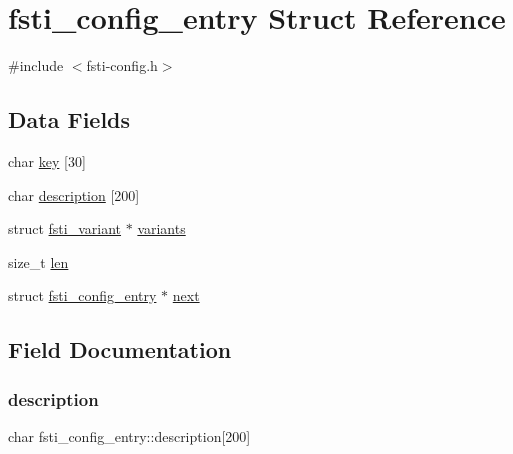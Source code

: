 \hypertarget{structfsti__config__entry}{}\section{fsti\+\_\+config\+\_\+entry Struct Reference}
\label{structfsti__config__entry}


{\ttfamily \#include $<$fsti-\/config.\+h$>$}

\subsection*{Data Fields}
\begin{DoxyCompactItemize}
\item 
char \mbox{\hyperlink{structfsti__config__entry_ac9d616365f25f18d04fa9cd4d141860a}{key}} \mbox{[}30\mbox{]}
\item 
char \mbox{\hyperlink{structfsti__config__entry_a04240c49953dafa8879450149c3954d1}{description}} \mbox{[}200\mbox{]}
\item 
struct \mbox{\hyperlink{structfsti__variant}{fsti\+\_\+variant}} $\ast$ \mbox{\hyperlink{structfsti__config__entry_a0cde1f42c2d28c442930678728cae461}{variants}}
\item 
size\+\_\+t \mbox{\hyperlink{structfsti__config__entry_ab780e8c7002b1b0dccfbcafe0b7f1216}{len}}
\item 
struct \mbox{\hyperlink{structfsti__config__entry}{fsti\+\_\+config\+\_\+entry}} $\ast$ \mbox{\hyperlink{structfsti__config__entry_a3900e815b95ddedbfe86b63639804835}{next}}
\end{DoxyCompactItemize}


\subsection{Field Documentation}
\mbox{\label{structfsti__config__entry_a04240c49953dafa8879450149c3954d1}} 
\subsubsection{\texorpdfstring{description}{description}}
{\footnotesize\ttfamily char fsti\+\_\+config\+\_\+entry\+::description\mbox{[}200\mbox{]}}


